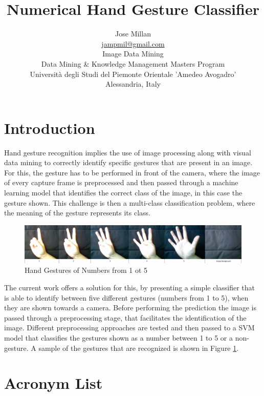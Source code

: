 \documentclass[a4paper,10pt,english]{article}
\title{Numerical Hand Gesture Classifier}
\author{Jose Millan\\
    \url{jampmil@gmail.com}\\
    Image Data Mining\\
    Data Mining \& Knowledge Management Masters Program\\
    Università degli Studi del Piemonte Orientale 'Amedeo Avogadro'\\
    Alessandria, Italy}
\date{}
\begin{document}
    \maketitle


     \section{Introduction}\label{sec:intro}
     
        Hand gesture recognition implies the use of image processing along with visual data mining to correctly identify specific gestures that are present in an image. For this, the gesture has to be performed in front of the camera, where the image of every capture frame is preprocessed and then passed through a machine learning model that identifies the correct class of the image, in this case the gesture shown. This challenge is then a multi-class classification problem, where the meaning of the gesture represents its class.
        
        \begin{figure}[h!]
            \centering
            \includegraphics[width=530pt]{images/hand_gestures}
            \caption{Hand Gestures of Numbers from 1 ot 5} \label{fig:hand_gestures}
        \end{figure}
        
        The current work offers a solution for this, by presenting a simple classifier that is able to identify between five different gestures (numbers from 1 to 5), when they are shown towards a camera. Before performing the prediction the image is passed through a preprocessing stage, that facilitates the identification of the image. Different preprocessing approaches are tested and then passed to a SVM model that classifies the gestures shown as a number between 1 to 5 or a non-gesture. A sample of the gestures that are recognized is shown in Figure \ref{fig:hand_gestures}.

     \section{Acronym List}
     
\end{document}
